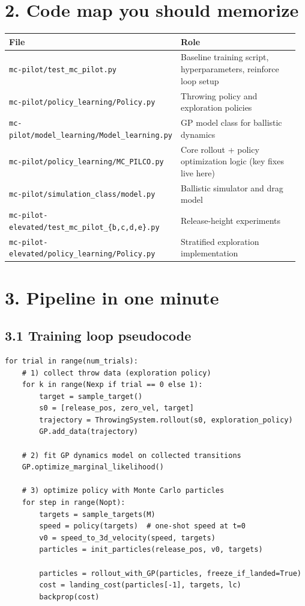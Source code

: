 \documentclass[11pt]{article}
\begin{document}
\section*{2. Code map you should memorize}
\begin{longtable}{p{0.30\linewidth} p{0.66\linewidth}}
\toprule
\textbf{File} & \textbf{Role} \\
\midrule
\texttt{mc-pilot/test\_mc\_pilot.py} & Baseline training script, hyperparameters, reinforce loop setup \\
\texttt{mc-pilot/policy\_learning/Policy.py} & Throwing policy and exploration policies \\
\texttt{mc-pilot/model\_learning/Model\_learning.py} & GP model class for ballistic dynamics \\
\texttt{mc-pilot/policy\_learning/MC\_PILCO.py} & Core rollout + policy optimization logic (key fixes live here) \\
\texttt{mc-pilot/simulation\_class/model.py} & Ballistic simulator and drag model \\
\texttt{mc-pilot-elevated/test\_mc\_pilot\_\{b,c,d,e\}.py} & Release-height experiments \\
\texttt{mc-pilot-elevated/policy\_learning/Policy.py} & Stratified exploration implementation \\
\bottomrule
\end{longtable}

\section*{3. Pipeline in one minute}
\subsection*{3.1 Training loop pseudocode}
\begin{lstlisting}[style=py]
for trial in range(num_trials):
    # 1) collect throw data (exploration policy)
    for k in range(Nexp if trial == 0 else 1):
        target = sample_target()
        s0 = [release_pos, zero_vel, target]
        trajectory = ThrowingSystem.rollout(s0, exploration_policy)
        GP.add_data(trajectory)

    # 2) fit GP dynamics model on collected transitions
    GP.optimize_marginal_likelihood()

    # 3) optimize policy with Monte Carlo particles
    for step in range(Nopt):
        targets = sample_targets(M)
        speed = policy(targets)  # one-shot speed at t=0
        v0 = speed_to_3d_velocity(speed, targets)
        particles = init_particles(release_pos, v0, targets)

        particles = rollout_with_GP(particles, freeze_if_landed=True)
        cost = landing_cost(particles[-1], targets, lc)
        backprop(cost)
\end{lstlisting}
\end{document}
